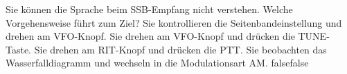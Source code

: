     {Sie können die Sprache beim SSB-Empfang nicht verstehen. Welche Vorgehensweise führt zum Ziel?}
    {Sie kontrollieren die Seitenbandeinstellung und drehen am VFO-Knopf.}
    {Sie drehen am VFO-Knopf und drücken die TUNE-Taste.}
    {Sie drehen am RIT-Knopf und drücken die PTT.}
    {Sie beobachten das Wasserfalldiagramm und wechseln in die Modulationsart AM.}
    {false}{false}